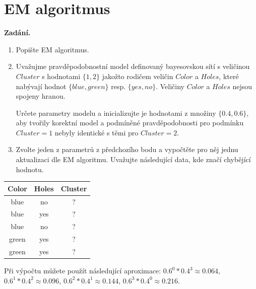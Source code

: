 \section{EM algoritmus}

\noindent\textbf{Zadání.}\par
\begin{enumerate}
  \item Popište EM algoritmus.
  \item Uvažujme pravděpodobnostní model definovaný bayesovskou sítí s veličinou $\mathit{Cluster}$ s hodnotami $\{1,2\}$ jakožto rodičem
    veličin $\mathit{Color}$ a $\mathit{Holes}$, které nabývají hodnot $\{\mathit{blue}, \mathit{green}\}$ resp. $\{\mathit{yes}, \mathit{no}\}$. Veličiny $\mathit{Color}$ a $\mathit{Holes}$ nejsou spojeny
    hranou.

    Určete parametry modelu a inicializujte je hodnotami z množiny $\{0{.}4, 0{.}6\}$, aby tvořily korektní model a podmíněné
    pravděpodobnosti pro podmínku $\mathit{Cluster}=1$ nebyly identické s těmi pro $\mathit{Cluster}=2$.
  \item Zvolte jeden z parametrů z předchozího bodu a vypočtěte pro něj jednu aktualizaci dle EM algoritmu. Uvažujte
    následující data, kde  značí chybějící hodnotu.
\end{enumerate}

\begin{center}
\begin{tabular}{cc|c}
\toprule
Color & Holes & Cluster \\
\midrule
blue  & no  & ? \\
blue  & yes & ? \\
blue  & no  & ? \\
green & yes & ? \\
green & yes & ? \\
\bottomrule
\end{tabular}
\end{center}

\noindent Při výpočtu můžete použít následující aproximace:
$0{.}6^0 * 0{.}4^3 \approx 0{.}064$, $0{.}6^1 * 0{.}4^2 \approx 0{.}096$, $0{.}6^2 * 0{.}4^1 \approx 0{.}144$, $0{.}6^3 * 0{.}4^0 \approx 0{.}216$.

